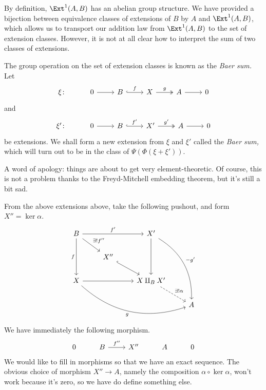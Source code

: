 \documentclass[main.tex]{subfiles}
\begin{document}
By definition, $\Ext^{1}(A, B)$ has an abelian group structure. We have provided a bijection between equivalence classes of extensions of $B$ by $A$ and $\Ext^{1}(A, B)$, which allows us to transport our addition law from $\Ext^{1}(A, B)$ to the set of extension classes. However, it is not at all clear how to interpret the sum of two classes of extensions.

The group operation on the set of extension classes is known as the \emph{Baer sum.} Let
\begin{equation*}
  \begin{tikzcd}
    \xi\colon
    & 0
    \arrow[r]
    & B
    \arrow[r, hook, "f"]
    & X
    \arrow[r, two heads, "g"]
    & A
    \arrow[r]
    & 0
  \end{tikzcd}
\end{equation*}
and
\begin{equation*}
  \begin{tikzcd}
    \xi'\colon
    & 0
    \arrow[r]
    & B
    \arrow[r, hook, "f'"]
    & X'
    \arrow[r, two heads, "g'"]
    & A
    \arrow[r]
    & 0
  \end{tikzcd}
\end{equation*}
be extensions. We shall form a new extension from $\xi$ and $\xi'$ called the \emph{Baer sum,} which will turn out to be in the class of $\Psi(\Phi(\xi + \xi'))$.

A word of apology: things are about to get very element-theoretic. Of course, this is not a problem thanks to the Freyd-Mitchell embedding theorem, but it's still a bit sad.

From the above extensions above, take the following pushout, and form $X'' = \ker \alpha$.
\begin{equation*}
  \begin{tikzcd}
    B
    \arrow[rr, "f'"]
    \arrow[dd, swap, "f"]
    \arrow[dr, "\exists!f''"]
    && X'
    \arrow[dd]
    \arrow[dddr, bend left, "-g'"]
    \\
    & X''
    \arrow[dr, hook]
    \\
    X
    \arrow[rr]
    \arrow[drrr, swap, bend right, "g"]
    && X \amalg_{B} X'
    \arrow[dr, dashed, "\exists!\alpha"]
    \\
    &&& A
  \end{tikzcd}
\end{equation*}
We have immediately the following morphism.
\begin{equation*}
  \begin{tikzcd}
    0
    & B
    \arrow[r, "f''"]
    & X''
    & A
    & 0
  \end{tikzcd}
\end{equation*}
We would like to fill in morphisms so that we have an exact sequence. The obvious choice of morphism $X'' \to A$, namely the composition $\alpha \circ \ker \alpha$, won't work because it's zero, so we have do define something else.
\end{document}
